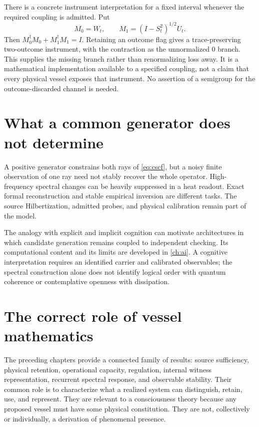 There is a concrete instrument interpretation for a fixed interval whenever the required coupling is admitted. Put
\[
 M_0=W_t,\qquad
 M_1=(I-S_t^2)^{1/2}U_t.
\]
Then $M_0^\dagger M_0+M_1^\dagger M_1=I$. Retaining an outcome flag gives a trace-preserving two-outcome instrument, with the contraction as the unnormalized $0$ branch. This supplies the missing branch rather than renormalizing loss away. It is a mathematical implementation available to a specified coupling, not a claim that every physical vessel exposes that instrument. No assertion of a semigroup for the outcome-discarded channel is needed.

\section{What a common generator does not determine}\label{section:cscf:what-a-common-generator-does-not-determine}
A positive generator constrains both rays of \cref{eq:cscf}, but a noisy finite observation of one ray need not stably recover the whole operator. High-frequency spectral changes can be heavily suppressed in a heat readout. Exact formal reconstruction and stable empirical inversion are different tasks. The source Hilbertization, admitted probes, and physical calibration remain part of the model.

The analogy with explicit and implicit cognition can motivate architectures in which candidate generation remains coupled to independent checking. Its computational content and its limits are developed in \cref{ch:ai}. A cognitive interpretation requires an identified carrier and calibrated observables; the spectral construction alone does not identify logical order with quantum coherence or contemplative openness with dissipation.

\section{The correct role of vessel mathematics}\label{section:cscf:the-correct-role-of-vessel-mathematics}
The preceding chapters provide a connected family of results: source sufficiency, physical retention, operational capacity, regulation, internal witness representation, recurrent spectral response, and observable stability. Their common role is to characterize what a realized system can distinguish, retain, use, and represent. They are relevant to a consciousness theory because any proposed vessel must have some physical constitution. They are not, collectively or individually, a derivation of phenomenal presence.

